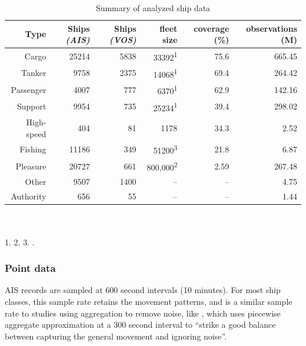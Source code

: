 \begin{table}[htbp]
  \caption[Summary of analyzed ship data]{Summary of analyzed ship data}
  \begin{tabular}{rrrrrr} %
    \hline
    \small{Type} & \small{Ships \textit{(AIS)}} & \small{Ships \textit{(VOS)}} & \small{fleet size} & \small{coverage} (\%) & \small{observations} (M) \\
    \hline
    Cargo & 25214 & 5838 & 33392\textsuperscript{1} & 75.6 & 665.45 \\
    Tanker & 9758 & 2375 & 14068\textsuperscript{1} & 69.4 & 264.42 \\
    Passenger & 4007 & 777 & 6370\textsuperscript{1} & 62.9 & 142.16 \\
    Support & 9954 & 735 & 25234\textsuperscript{1} & 39.4 & 298.02 \\
    High-speed & 404 & 81 & 1178 & 34.3 & 2.52 \\
    Fishing & 11186 & 349 & 51200\textsuperscript{3} & 21.8 & 6.87 \\
    Pleasure & 20727 & 661 & 800,000\textsuperscript{2} & 2.59 & 267.48 \\
    Other & 9507 & 1400 & -- & -- & 4.75 \\
    Authority & 656 & 55 & -- & -- & 1.44 \\
  \end{tabular}
\\
\\
  1. \cite{Equasis2011} 2. \cite{westwood2001global} 3. \cite{FAOfishing}.
  \label{table:ships-by-type}
\end{table}

\subsubsection{Point data}

AIS records are sampled at 600 second intervals (10 minutes). For most ship classes, this sample rate retains the movement patterns, and is a similar sample rate to studies using aggregation to remove noise, like \cite{Vries2009}, which uses piecewise aggregate approximation at a 300 second interval to ``strike a good balance between capturing the general movement and ignoring noise''. %


